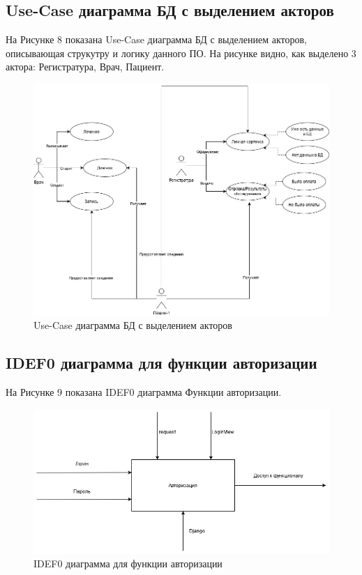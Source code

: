\documentclass[a4paper, 10pt]{article}
\begin{document}
	\subsection{Use-Case диаграмма БД с выделением акторов}
	На Рисунке 8 показана Use-Case диаграмма БД с выделением акторов, описывающая струкутру и логику данного ПО. На рисунке видно, как выделено 3 актора: Регистратура, Врач, Пациент. 
	\begin{figure}[h!]
		\centering
		\includegraphics[scale=0.5]{use-case}
		\centering\caption{Use-Case диаграмма БД с выделением акторов}
	\end{figure}
	\subsection{IDEF0 диаграмма для функции авторизации}
	На Рисунке 9 показана IDEF0 диаграмма Функции авторизации. 
	\clearpage
	\newpage
	\begin{figure}[h!]
		\centering
		\includegraphics[scale=0.5]{idef02}
		\centering\caption{IDEF0 диаграмма для функции авторизации}
	\end{figure}
\end{document}
